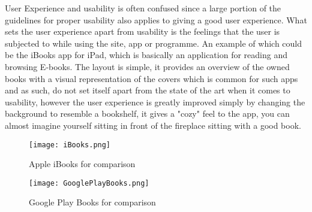 User Experience and usability is often confused since a large portion of the guidelines for proper usability also applies to giving a good user experience. What sets the user experience apart from usability is the feelings that the user is subjected to while using the site, app or programme.
An example of which could be the iBooks app for iPad, which is basically an application for reading and browsing E-books. The layout is simple,  it provides an overview of the owned books with a visual representation of the covers which is common for such apps and as such, do not set itself apart from the state of the art when it comes to usability, however the user experience is greatly improved simply by changing the background to resemble a bookshelf, it gives a "cozy" feel to the app, you can almost imagine yourself sitting in front of the fireplace sitting with a good book.
\begin{figure}[H]
\centering
\texttt{[image: iBooks.png]}
\caption{Apple iBooks for comparison}
\end{figure}

\begin{figure}[H]
\centering
\texttt{[image: GooglePlayBooks.png]}
\caption{Google Play Books for comparison}
\end{figure}


